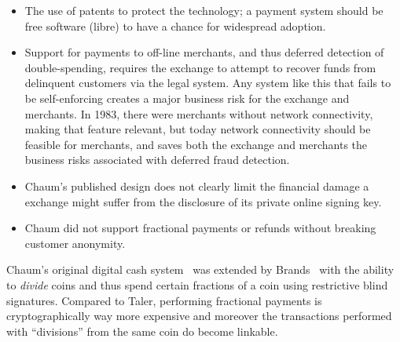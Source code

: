 \documentclass{llncs}
\begin{document}
\begin{itemize}
 \item The use of patents to protect the technology; a payment system
   should be free software (libre) to have a chance for widespread adoption.
 \item Support for payments to off-line merchants, and thus deferred
   detection of double-spending, requires the exchange to attempt to
   recover funds from delinquent customers via the legal system.  
   Any system like this that fails to be self-enforcing creates a major
   business risk for the exchange and merchants.  
   In 1983, there were merchants without network connectivity, making that
   feature relevant, but today network connectivity should be feasible for
   merchants, and saves both the exchange and merchants the business risks
   associated with deferred fraud detection.
 \item %
   Chaum's published design does not clearly
   limit the financial damage a exchange might suffer from the
   disclosure of its private online signing key.
 \item Chaum did not support fractional payments or refunds without
   breaking customer anonymity.
\end{itemize}

Chaum's original digital cash system~\cite{chaum1983blind} was
extended by Brands~\cite{brands1993efficient} with the ability to {\em
  divide} coins and thus spend certain fractions of a coin using
restrictive blind signatures.  Compared to Taler, performing
fractional payments is cryptographically way more expensive and
moreover the transactions performed with ``divisions'' from the same
coin do become linkable.
%
%
\end{document}
